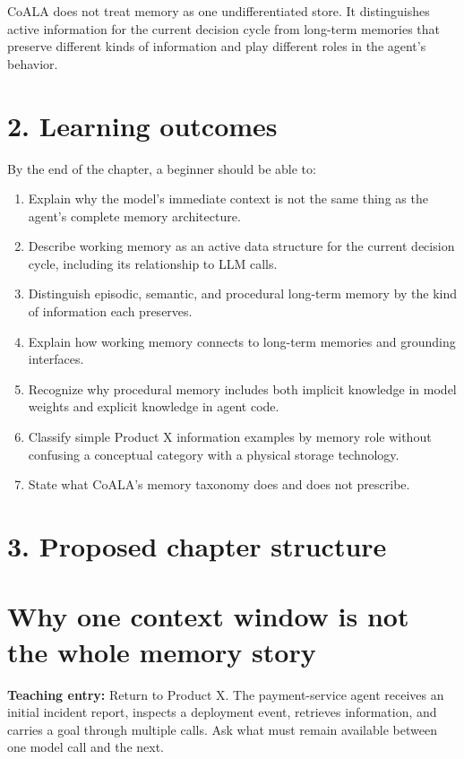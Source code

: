 \begin{takeawaybox}
CoALA does not treat memory as one undifferentiated store. It distinguishes active information for the current decision cycle from long-term memories that preserve different kinds of information and play different roles in the agent's behavior.
\end{takeawaybox}

\section*{2. Learning outcomes}
By the end of the chapter, a beginner should be able to:
\begin{enumerate}
  \item Explain why the model's immediate context is not the same thing as the agent's complete memory architecture.
  \item Describe working memory as an active data structure for the current decision cycle, including its relationship to LLM calls.
  \item Distinguish episodic, semantic, and procedural long-term memory by the kind of information each preserves.
  \item Explain how working memory connects to long-term memories and grounding interfaces.
  \item Recognize why procedural memory includes both implicit knowledge in model weights and explicit knowledge in agent code.
  \item Classify simple Product X information examples by memory role without confusing a conceptual category with a physical storage technology.
  \item State what CoALA's memory taxonomy does and does not prescribe.
\end{enumerate}

\section*{3. Proposed chapter structure}
\setcounter{chapter}{3}
\section{Why one context window is not the whole memory story}
\textbf{Teaching entry:} Return to Product X. The payment-service agent receives an initial incident report, inspects a deployment event, retrieves information, and carries a goal through multiple calls. Ask what must remain available between one model call and the next.

